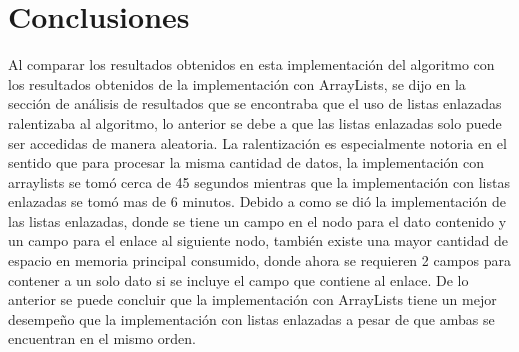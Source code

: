 \section{Conclusiones}

Al comparar los resultados obtenidos en esta implementación del algoritmo con los resultados obtenidos de la implementación con ArrayLists, se dijo en la sección de análisis de resultados que se encontraba que el uso de listas enlazadas ralentizaba al algoritmo, lo anterior se debe a que las listas enlazadas solo puede ser accedidas de manera aleatoria. La ralentización es especialmente notoria en el sentido que para procesar la misma cantidad de datos, la implementación con arraylists se tomó cerca de 45 segundos mientras que la implementación con listas enlazadas se tomó mas de 6 minutos. Debido a como se dió la implementación de las listas enlazadas, donde se tiene un campo en el nodo para el dato contenido y un campo para el enlace al siguiente nodo, también existe una mayor cantidad de espacio en memoria principal consumido, donde ahora se requieren 2 campos para contener a un solo dato si se incluye el campo que contiene al enlace. De lo anterior se puede concluir que la implementación con ArrayLists tiene un mejor desempeño que la implementación con listas enlazadas a pesar de que ambas se encuentran en el mismo orden.